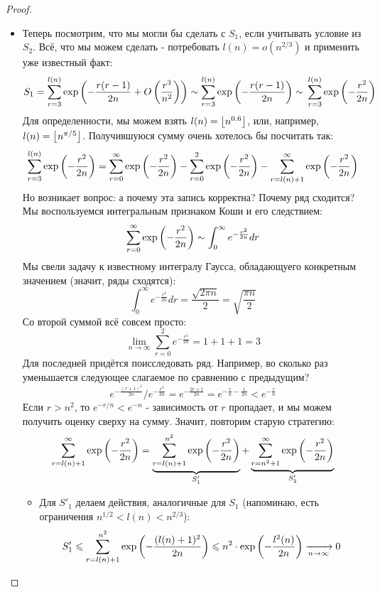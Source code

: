 \begin{proof}
\begin{itemize}
		\item Теперь посмотрим, что мы могли бы сделать с $S_1$, если учитывать условие из $S_2$. Всё, что мы можем сделать - потребовать $l(n) = o(n^{2/3})$ и применить уже известный факт:
		\[
			S_1 = \sum_{r = 3}^{l(n)} \exp\left(-\frac{r(r - 1)}{2n} + O\left(\frac{r^3}{n^2}\right)\right) \sim \sum_{r = 3}^{l(n)} \exp\left(-\frac{r(r - 1)}{2n}\right) \sim
			\\
			\sum_{r = 3}^{l(n)} \exp\left(-\frac{r^2}{2n}\right)
		\]
		Для определенности, мы можем взять $l(n) = \left\lfloor n^{0.6} \right\rfloor$, или, например, $l(n) = \left\lfloor n^{\pi / 5} \right\rfloor$. Получившуюся сумму очень хотелось бы посчитать так:
		\[
			\sum_{r = 3}^{l(n)} \exp\left(-\frac{r^2}{2n}\right) = \sum_{r = 0}^\infty \exp\left(-\frac{r^2}{2n}\right) - \sum_{r = 0}^2 \exp\left(-\frac{r^2}{2n}\right) - \sum_{r = l(n) + 1}^\infty \exp\left(-\frac{r^2}{2n}\right)
		\]
		Но возникает вопрос: а почему эта запись корректна? Почему ряд сходится? Мы воспользуемся интегральным признаком Коши и его следствием:
		\[
			\sum_{r = 0}^\infty \exp\left(-\frac{r^2}{2n}\right) \sim \int_0^\infty e^{-\frac{r^2}{2n}}dr
		\]
		Мы свели задачу к известному интегралу Гаусса, обладающуего конкретным значением (значит, ряды сходятся):
		\[
			\int_0^\infty e^{-\frac{r^2}{2n}}dr = \frac{\sqrt{2\pi n}}{2} = \sqrt{\frac{\pi n}{2}}
		\]
		Со второй суммой всё совсем просто:
		\[
			\lim_{n \to \infty} \sum_{r = 0}^2 e^{-\frac{r^2}{2n}} = 1 + 1 + 1 = 3
		\]
		Для последней придётся поисследовать ряд. Например, во сколько раз уменьшается следующее слагаемое по сравнению с предыдущим?
		\[
			e^{-\frac{(r + 1)^2}{2n}} / e^{-\frac{r^2}{2n}} = e^{-\frac{2r + 1}{2n}} = e^{-\frac{r}{n} - \frac{1}{2n}} < e^{-\frac{r}{n}}
		\]
		Если $r > n^2$, то $e^{-r/n} < e^{-n}$ - зависимость от $r$ пропадает, и мы можем получить оценку сверху на сумму. Значит, повторим старую стратегию:
		\[
			\sum_{r = l(n) + 1}^\infty \exp\left(-\frac{r^2}{2n}\right) = \underbrace{\sum_{r = l(n) + 1}^{n^2} \exp\left(-\frac{r^2}{2n}\right)}_{S'_1} + \underbrace{\sum_{r = n^2 + 1}^\infty \exp\left(-\frac{r^2}{2n}\right)}_{S'_2}
		\]
		\begin{itemize}
			\item Для $S'_1$ делаем действия, аналогичные для $S_1$ (напоминаю, есть ограничения $n^{1/2} < l(n) < n^{2/3}$):
			\[
				S'_1 \leqslant \sum_{r = l(n) + 1}^{n^2} \exp\left(-\frac{(l(n) + 1)^2}{2n}\right) \leqslant n^2 \cdot \exp\left(-\frac{l^2(n)}{2n}\right) \xrightarrow[n \to \infty]{} 0
			\]
			

\end{itemize}
\end{itemize}
\end{proof}
